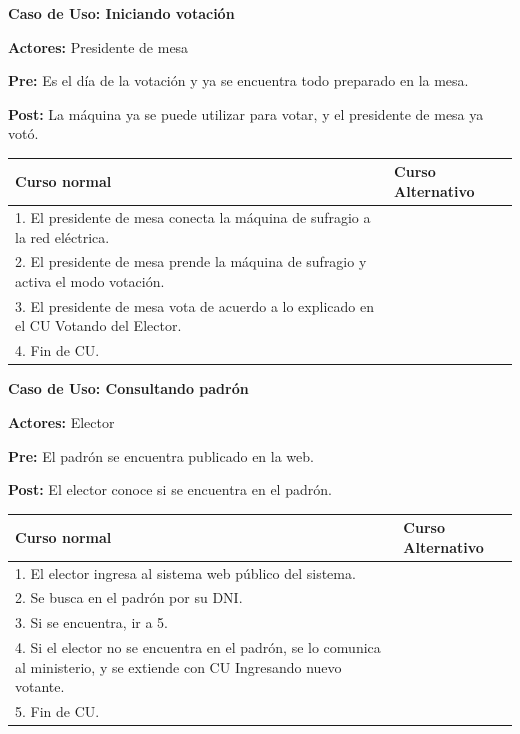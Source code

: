 \textbf{Caso de Uso: Iniciando votación}

\textbf{Actores:} Presidente de mesa

\textbf{Pre:} Es el día de la votación y ya se encuentra todo preparado en la mesa.

\textbf{Post:} La máquina ya se puede utilizar para votar, y el presidente de mesa ya votó.

\begin{table}[h!]
	
 \begin{tabular}{|p{7.5cm} | p{7.5cm}|} 
 \hline
 \textbf{Curso normal} & \textbf{Curso Alternativo} \\
 \hline

1. El presidente de mesa conecta la máquina de sufragio a la red eléctrica. & \\
\hline
2. El presidente de mesa prende la máquina de sufragio y activa el modo votación. & \\
\hline
3. El presidente de mesa vota de acuerdo a lo explicado en el CU Votando del Elector. & \\
\hline
4. Fin de CU.& \\
\hline



 \end{tabular}

\end{table}



\textbf{Caso de Uso:  Consultando padrón}

\textbf{Actores:} Elector 

\textbf{Pre:} El padrón se encuentra publicado en la web. 

\textbf{Post:}  El elector conoce si se encuentra en el padrón.

\begin{table}[h!]
	
 \begin{tabular}{|p{7.5cm} | p{7.5cm}|} 
 \hline
 \textbf{Curso normal} & \textbf{Curso Alternativo} \\
 \hline

1. El elector ingresa al sistema web público del sistema. & \\
 \hline



2. Se busca en el padrón por su DNI. & \\
 \hline



3. Si se encuentra, ir a 5. & \\
 \hline



4. Si el elector no se encuentra en el padrón, se lo comunica al ministerio, y se extiende con CU Ingresando nuevo votante. & \\
 \hline



5. Fin de CU. & \\
 \hline


 \end{tabular}

\end{table}





